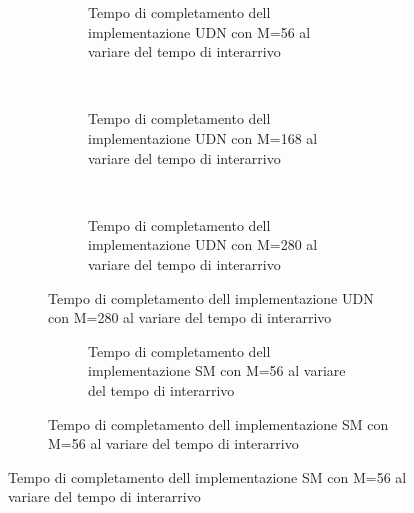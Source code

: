 \begin{figure}[p]
  \caption{Grafici del tempo di completamento al variare del tempo di interarrivo}
  \begin{subfigure}[b]{.5\columnwidth}
    \centering
    \renewcommand\thesubfigure{\alph{subfigure}}
    \caption{Implementazione con solo UDN}
    \begin{subfigure}[b]{\textwidth}
      \centering
      \addtocounter{subfigure}{-1}
      \renewcommand\thesubfigure{\alph{subfigure}1}
      \resizebox{\columnwidth}{!}{}
      \caption{Tempo di completamento dell implementazione UDN con M=56 al variare del tempo di interarrivo}
      \label{fig:scalability_UDN_size56}
    \end{subfigure}
    ~
    \begin{subfigure}[b]{\textwidth}
      \centering
      \addtocounter{subfigure}{-1}
      \renewcommand\thesubfigure{\alph{subfigure}2}
      \resizebox{\columnwidth}{!}{}
      \caption{Tempo di completamento dell implementazione UDN con M=168 al variare del tempo di interarrivo}
      \label{fig:scalability_UDN_size168}
    \end{subfigure}
    ~
    \begin{subfigure}[b]{\textwidth}
      \centering
      \addtocounter{subfigure}{-1}
      \renewcommand\thesubfigure{\alph{subfigure}3}
      \resizebox{\columnwidth}{!}{}
      \caption{Tempo di completamento dell implementazione UDN con M=280 al variare del tempo di interarrivo}
      \label{fig:scalability_UDN_size280}
    \end{subfigure}
    \label{fig:allScalbility_UDN}
  \end{subfigure}
  \hspace{2ex}
  \begin{subfigure}[b]{.5\columnwidth}
    \centering
    \renewcommand\thesubfigure{\alph{subfigure}}
    \caption{Implementazione con solo SM}
    \begin{subfigure}[b]{\textwidth}
      \centering
      \addtocounter{subfigure}{-1}
      \renewcommand\thesubfigure{\alph{subfigure}1}
      \resizebox{\columnwidth}{!}{}
      \caption{Tempo di completamento dell implementazione SM con M=56 al variare del tempo di interarrivo}
      \label{fig:scalability_SM_size56}

\end{subfigure}
\end{subfigure}
\end{figure}
